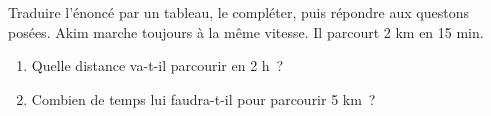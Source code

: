 \documentclass[exercice]{thedocument}%
\begin{document}
%
Traduire l'énoncé par un tableau, le compléter, puis
répondre aux questons posées.\vskip5pt
Akim marche toujours à la même vitesse. Il parcourt 2 km en 15 min.
\begin{enumerate}
    \item Quelle distance va-t-il parcourir en 2 h~?
    \item Combien de temps lui faudra-t-il pour parcourir 5 km~?
\end{enumerate}
\end{document}
